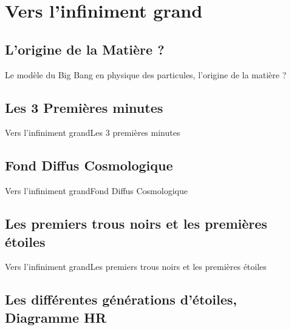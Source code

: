 \documentclass[handout,8pt]{beamer} %
\begin{document}

\section{Vers l’infiniment grand}

\begin{frame}
\end{frame}

\subsection{L'origine de la Matière ?}
\begin{frame}{Le modèle du Big Bang en physique des particules, l'origine de la matière ?}

\end{frame}

\subsection{Les 3 Premières minutes}
\begin{frame}{Vers l’infiniment grand}{Les 3 premières minutes}

\end{frame}

\subsection{Fond Diffus Cosmologique}
\begin{frame}{Vers l’infiniment grand}{Fond Diffus Cosmologique}

\end{frame}

\subsection{Les premiers trous noirs et les premières étoiles}
\begin{frame}{Vers l’infiniment grand}{Les premiers trous noirs et les premières étoiles}

\end{frame}

\subsection{Les différentes générations d’étoiles, Diagramme HR}
\end{document}
